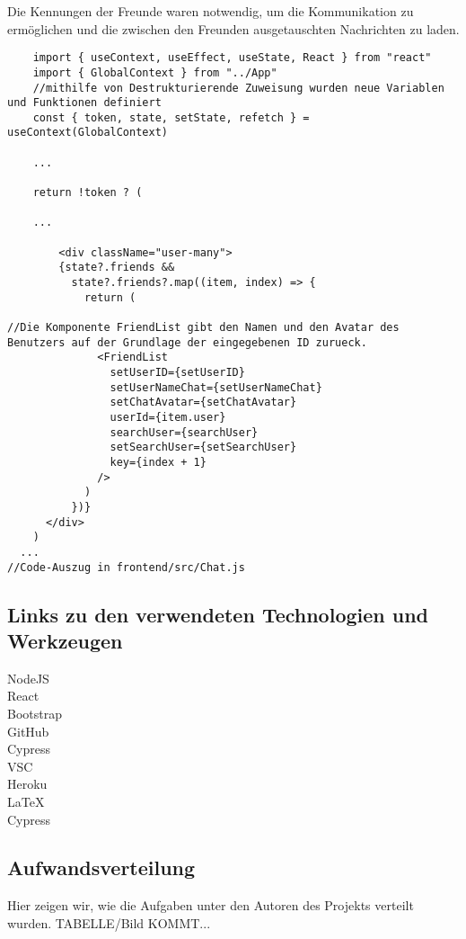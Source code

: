 Die Kennungen der Freunde waren notwendig, um die Kommunikation zu ermöglichen und die zwischen den Freunden ausgetauschten Nachrichten zu laden.
\begin{lstlisting}
    import { useContext, useEffect, useState, React } from "react"
    import { GlobalContext } from "../App"
    //mithilfe von Destrukturierende Zuweisung wurden neue Variablen und Funktionen definiert
    const { token, state, setState, refetch } = useContext(GlobalContext)

    ...

    return !token ? (

    ...

        <div className="user-many">
        {state?.friends &&
          state?.friends?.map((item, index) => {
            return (

//Die Komponente FriendList gibt den Namen und den Avatar des Benutzers auf der Grundlage der eingegebenen ID zurueck.
              <FriendList
                setUserID={setUserID}
                setUserNameChat={setUserNameChat}
                setChatAvatar={setChatAvatar}
                userId={item.user}
                searchUser={searchUser}
                setSearchUser={setSearchUser}
                key={index + 1}
              />
            )
          })}
      </div>
    )
  ...
//Code-Auszug in frontend/src/Chat.js
\end{lstlisting}

\subsection{Links zu den verwendeten Technologien und Werkzeugen}\label{subsec_UabsAnhang}
NodeJS
\\
React
\\
Bootstrap
\\
GitHub
\\
Cypress
\\
VSC
\\
Heroku
\\
LaTeX
\\
Cypress

\subsection{Aufwandsverteilung}\label{subsec_UabsAnhang}
Hier zeigen wir, wie die Aufgaben unter den Autoren des Projekts verteilt wurden.
TABELLE/Bild KOMMT...